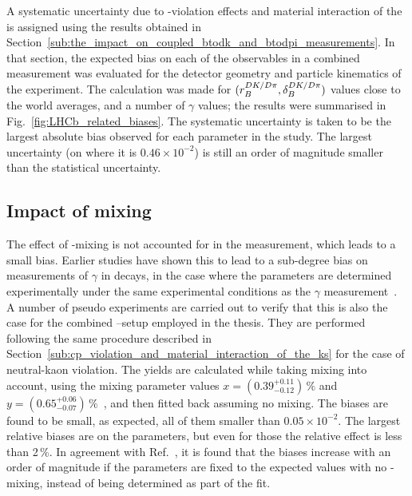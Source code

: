 A systematic uncertainty due to \CP-violation effects and material interaction of the \KS is assigned using the results obtained in Section~\ref{sub:the_impact_on_coupled_btodk_and_btodpi_measurements}. In that section, the expected bias on each of the observables in a combined \BtoDh measurement was evaluated for the detector geometry and particle kinematics of the \lhcb experiment. The calculation was made for $(r_B^{DK/{D}\pi},\delta_B^{DK/{D}\pi})$ values close to the world averages, and a number of $\gamma$ values; the results were summarised in Fig.~\ref{fig:LHCb_related_biases}. 
The systematic uncertainty is taken to be the largest absolute bias observed for each parameter in the study. The largest uncertainty (on \yxidpi where it is $0.46\times 10^{-2}$) is still an order of magnitude smaller than the statistical uncertainty.
 


\subsection{Impact of \D mixing} %
\label{sub:impact_of_d_mixing}

The effect of \D-mixing is not accounted for in the measurement, which leads to a small bias. Earlier studies have shown this to lead to a sub-degree bias on measurements of $\gamma$ in \BtoDK decays, in the case where the \Fi parameters are determined experimentally under the same experimental conditions as the $\gamma$ measurement~\cite{Dmixing}. A number of pseudo experiments are carried out to verify that this is also the case for the combined \DK--\Dpi setup employed in the thesis. They are performed following the same procedure described in Section~\ref{sub:cp_violation_and_material_interaction_of_the_ks} for the case of neutral-kaon \CP violation. The yields are calculated while taking \D mixing into account, using the mixing parameter values $x=(0.39^{+0.11}_{-0.12})\,\%$ and $y=(0.65^{+0.06}_{-0.07})\,\%$~\cite{PDG2020}, and then fitted back assuming no \D mixing. The biases are found to be small, as expected, all of them smaller than $0.05\times 10^{-2}$. The largest relative biases are on the \BtoDpi parameters, but even for those the relative effect is less than 2\,\%. In agreement with Ref.~\cite{Dmixing}, it is found that the biases increase with an order of magnitude if the \Fi parameters are fixed to the expected values with no \D-mixing, instead of being determined as part of the fit.

